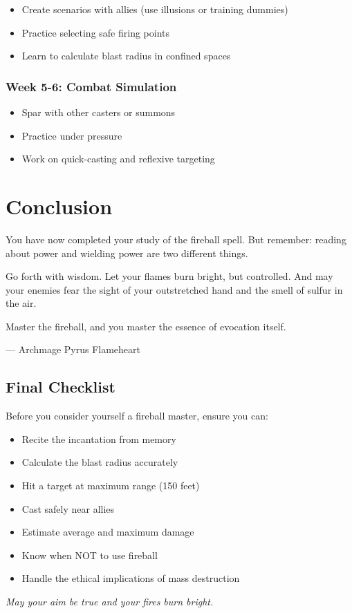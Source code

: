 \documentclass[letterpaper,twocolumn,openany]{dndbook}
\begin{document}
\begin{itemize}
    \item Create scenarios with allies (use illusions or training dummies)
    \item Practice selecting safe firing points
    \item Learn to calculate blast radius in confined spaces
\end{itemize}

\subsection{Week 5-6: Combat Simulation}

\begin{itemize}
    \item Spar with other casters or summons
    \item Practice under pressure
    \item Work on quick-casting and reflexive targeting
\end{itemize}

\chapter{Conclusion}

\begin{DndReadAloud}
    You have now completed your study of the fireball spell. But remember: reading about power and wielding power are two different things.

    Go forth with wisdom. Let your flames burn bright, but controlled. And may your enemies fear the sight of your outstretched hand and the smell of sulfur in the air.

    Master the fireball, and you master the essence of evocation itself.

    \hfill — Archmage Pyrus Flameheart
\end{DndReadAloud}

\section{Final Checklist}

Before you consider yourself a fireball master, ensure you can:

\begin{itemize}
    \item[$\square$] Recite the incantation from memory
    \item[$\square$] Calculate the blast radius accurately
    \item[$\square$] Hit a target at maximum range (150 feet)
    \item[$\square$] Cast safely near allies
    \item[$\square$] Estimate average and maximum damage
    \item[$\square$] Know when NOT to use fireball
    \item[$\square$] Handle the ethical implications of mass destruction
\end{itemize}

\vfill

\begin{center}
    \textit{May your aim be true and your fires burn bright.}
\end{center}
\end{document}
